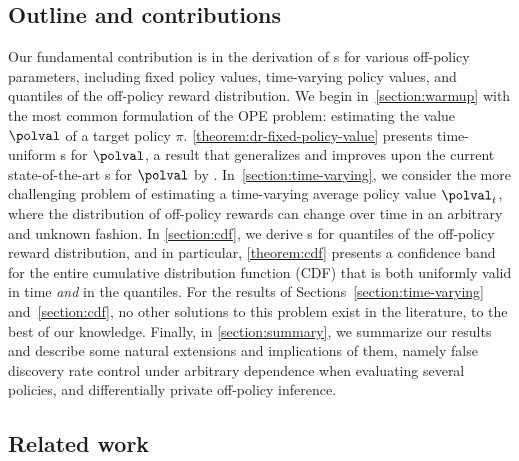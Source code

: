\subsection{Outline and contributions}
Our fundamental contribution is in the derivation of \cs{}s for various off-policy parameters, including fixed policy values, time-varying policy values, and quantiles of the off-policy reward distribution. We begin in~\cref{section:warmup} with the most common formulation of the OPE problem: estimating the value $\polval$ of a target policy $\pi$. \cref{theorem:dr-fixed-policy-value} presents time-uniform \cs{}s for $\polval$, a result that generalizes and improves upon the current state-of-the-art \cs{}s for $\polval$  by \citet{karampatziakis2021off}. In~\cref{section:time-varying}, we consider the more challenging problem of estimating a time-varying average policy value $\polval_t$, where the distribution of off-policy rewards can change over time in an arbitrary and unknown fashion. In \cref{section:cdf}, we derive \cs{}s for quantiles of the off-policy reward distribution, and in particular, \cref{theorem:cdf} presents a confidence band for the entire cumulative distribution function (CDF) that is both uniformly valid in time \emph{and} in the quantiles. For the results of Sections~\ref{section:time-varying} and~\ref{section:cdf}, no other solutions to this problem exist in the literature, to the best of our knowledge. Finally, in \cref{section:summary}, we summarize our results and describe some natural extensions and implications of them, namely false discovery rate control under arbitrary dependence when evaluating several policies, and differentially private off-policy inference.

\subsection{Related work}

